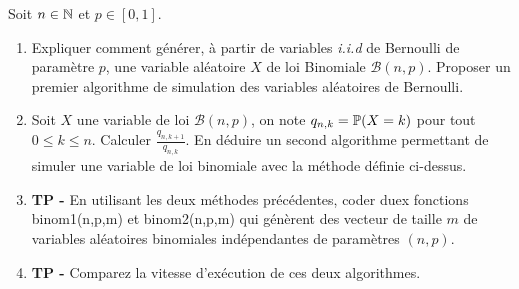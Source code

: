\documentclass[solutions]{exercices}
\begin{document}
\begin{exercice}
Soit $n \in \N$ et $p \in [0,1]$.
\begin{enumerate}
  \item Expliquer comment g\'en\'erer, à partir de variables \textit{i.i.d} de Bernoulli de paramètre $p$, une variable al\'eatoire $X$ de loi Binomiale $\mathcal{B}(n,p)$. Proposer un premier algorithme de simulation des variables aléatoires de Bernoulli.
  \item Soit $X$ une variable de loi $\mathcal{B}(n,p)$, on note $q_{n,k} = \P(X = k)$ pour tout $0 \leq k \leq n$. Calculer $\frac{q_{n,k+1}}{q_{n,k}}$. En déduire un second algorithme permettant de simuler une variable de loi binomiale avec la méthode définie ci-dessus.
\item \textbf{TP -}  En utilisant les deux méthodes précédentes, coder duex fonctions binom1(n,p,m) et binom2(n,p,m) qui génèrent des vecteur de taille $m$ de variables aléatoires binomiales indépendantes de paramètres $(n,p)$.
\item \textbf{TP -} Comparez la vitesse d'exécution de ces deux algorithmes.
\end{enumerate}
\end{exercice}
\end{document}
